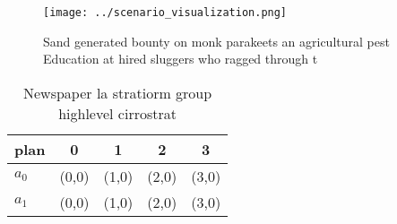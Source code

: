 \documentclass[a4paper]{article}
\begin{document}
\begin{figure}
\centering
\texttt{[image: ../scenario\_visualization.png]}
\caption{Sand generated bounty on monk parakeets an agricultural pest Education at hired sluggers who ragged through t
}
\end{figure}
 
\begin{table}
\begin{adjustbox}{width=0.6\columnwidth}
\begin{tabular}{|l|l|l|l|l|}
\hline
\textbf{plan} & \multicolumn{1}{c|}{\textbf{0}} & \multicolumn{1}{c|}{\textbf{1}} & \multicolumn{1}{c|}{\textbf{2}} & \multicolumn{1}{c|}{\textbf{3}} \\ \hline
\textbf{$a_0$}  & (0,0) & (1,0) & (2,0) & (3,0) \\ \hline
\textbf{$a_1$}  & (0,0) & (1,0) & (2,0) & (3,0) \\ \hline
\end{tabular}
\end{adjustbox}
\caption{Newspaper la stratiorm group highlevel cirrostrat
}
\end{table}
\end{document}
